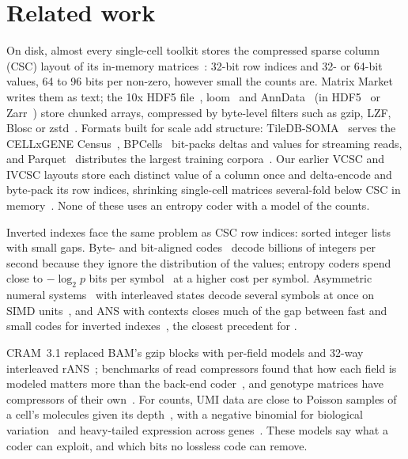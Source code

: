 \section{Related work}
\label{sec:related}

On disk, almost every single-cell toolkit stores the compressed sparse column (CSC) layout of
its in-memory matrices~\cite{bates2024matrix,virtanen2020scipy}: 32-bit row indices and 32- or 64-bit values, 64 to 96
bits per non-zero, however small the counts are. Matrix Market~\cite{boisvert1997matrix} writes them as text; the 10x HDF5
file~\cite{zheng2017massively,tenx_h5}, loom~\cite{loompy} and AnnData~\cite{virshup2024anndata} (in HDF5~\cite{hdf5} or
Zarr~\cite{zarr}) store chunked arrays, compressed by byte-level filters such as gzip, LZF, Blosc or
zstd~\cite{deutsch1996deflate,collet2021zstd}. Formats built for scale add structure: TileDB-SOMA~\cite{papadopoulos2016tiledb,tiledbsoma}
serves the CELLxGENE Census~\cite{czi2025cellxgene}, BPCells~\cite{parks2025bpcells} bit-packs deltas and values for
streaming reads, and Parquet~\cite{parquet} distributes the largest training corpora~\cite{tahoe100m_hf}. Our earlier VCSC
and IVCSC layouts store each distinct value of a column once and delta-encode and byte-pack its row indices, shrinking
single-cell matrices several-fold below CSC in memory~\cite{ruiter2024vcsc,wolfgang2024vcsc}. None of these uses an entropy coder with a
model of the counts.

Inverted indexes face the same problem as CSC row indices: sorted integer lists with small gaps.
Byte- and bit-aligned codes~\cite{lemire2018stream,lemire2015decoding} decode billions of integers per second because they
ignore the distribution of the values; entropy coders spend close to $-\log_2 p$ bits per symbol~\cite{cover2006elements}
at a higher cost per symbol. Asymmetric numeral systems~\cite{duda2013asymmetric} with interleaved states decode several
symbols at once on SIMD units~\cite{giesen2014interleaved}, and ANS with contexts closes much of the gap between fast and
small codes for inverted indexes~\cite{moffat2017ans,moffat2020large,pibiri2021techniques}, the closest precedent for
\sone.

CRAM~3.1 replaced BAM's gzip blocks with per-field models and 32-way interleaved
rANS~\cite{bonfield2022cram}; benchmarks of read compressors found that how each field is modeled matters more than the
back-end coder~\cite{numanagic2016comparison,hernaez2019genomic}, and genotype matrices have compressors of their
own~\cite{danek2018gtc,lan2021genozip}. For counts, UMI data are close to Poisson samples of a cell's molecules given its
depth~\cite{townes2019feature,kim2020demystifying}, with a negative binomial for biological
variation~\cite{svensson2020droplet,hafemeister2019normalization} and heavy-tailed expression across
genes~\cite{furusawa2003zipf}. These models say what a coder can exploit, and which bits no lossless code can remove.

